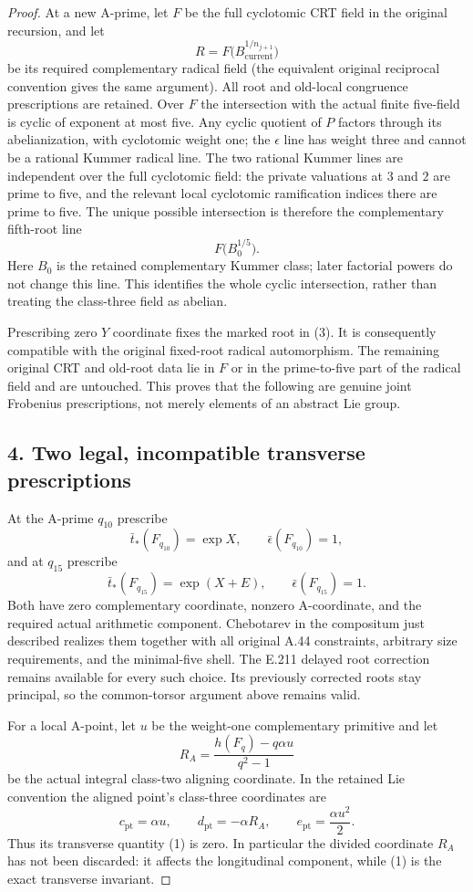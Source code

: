 \begin{proof}
At a new A-prime, let $F$ be the full cyclotomic CRT field in the original recursion, and let
\[
 R=F\bigl(B_{\mathrm{current}}^{1/n_{j+1}}\bigr)
\]
be its required complementary radical field (the equivalent original reciprocal convention gives the same argument). All root and old-local congruence prescriptions are retained. Over $F$ the intersection with the actual finite five-field is cyclic of exponent at most five. Any cyclic quotient of $P$ factors through its abelianization, with cyclotomic weight one; the $\epsilon$ line has weight three and cannot be a rational Kummer radical line. The two rational Kummer lines are independent over the full cyclotomic field: the private valuations at $3$ and $2$ are prime to five, and the relevant local cyclotomic ramification indices there are prime to five. The unique possible intersection is therefore the complementary fifth-root line
\[
 F\bigl(B_0^{1/5}\bigr).
 \tag{3}
\]
Here $B_0$ is the retained complementary Kummer class; later factorial powers do not change this line. This identifies the whole cyclic intersection, rather than treating the class-three field as abelian.

Prescribing zero $Y$ coordinate fixes the marked root in (3). It is consequently compatible with the original fixed-root radical automorphism. The remaining original CRT and old-root data lie in $F$ or in the prime-to-five part of the radical field and are untouched. This proves that the following are genuine joint Frobenius prescriptions, not merely elements of an abstract Lie group.

\subsection*{4. Two legal, incompatible transverse prescriptions}
At the A-prime $q_{10}$ prescribe
\[
 \bar t_*(F_{q_{10}})=\exp X,\qquad
 \bar\epsilon(F_{q_{10}})=1,
\]
and at $q_{15}$ prescribe
\[
 \bar t_*(F_{q_{15}})=\exp(X+E),\qquad
 \bar\epsilon(F_{q_{15}})=1.
 \tag{4}
\]
Both have zero complementary coordinate, nonzero A-coordinate, and the required actual arithmetic component. Chebotarev in the compositum just described realizes them together with all original A.44 constraints, arbitrary size requirements, and the minimal-five shell. The E.211 delayed root correction remains available for every such choice. Its previously corrected roots stay principal, so the common-torsor argument above remains valid.

For a local A-point, let $u$ be the weight-one complementary primitive and let
\[
 R_A=\frac{h(F_q)-q\alpha u}{q^2-1}
\]
be the actual integral class-two aligning coordinate. In the retained Lie convention the aligned point's class-three coordinates are
\[
 c_{\mathrm{pt}}=\alpha u,\qquad
 d_{\mathrm{pt}}=-\alpha R_A,\qquad
 e_{\mathrm{pt}}=\frac{\alpha u^2}{2}.
 \tag{5}
\]
Thus its transverse quantity (1) is zero. In particular the divided coordinate $R_A$ has not been discarded: it affects the longitudinal component, while (1) is the exact transverse invariant.


\end{proof}
